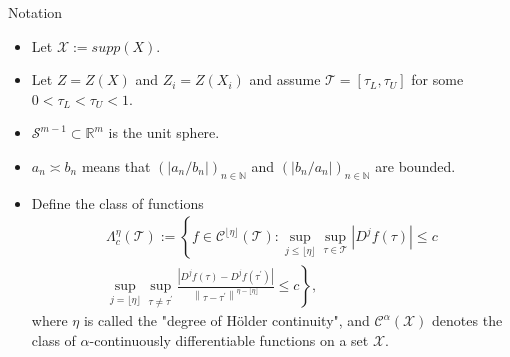 \documentclass[11pt]{beamer}
\begin{document}
\begin{frame}{Notation}
\begin{itemize}
\item Let $\mathcal{X}:=supp(X)$.
\item Let $Z=Z(X)$ and $Z_i=Z(X_i)$ and assume $\mathcal{T}=\left[\tau_{L}, \tau_{U}\right]$ for some $0<\tau_L<\tau_U<1$.
\item $\mathcal{S}^{m-1} \subset \mathbb{R}^{m}$ is the unit sphere.
\item $a_{n} \asymp b_{n}$ means that $\left(\left|a_{n} / b_{n}\right|\right)_{n \in \mathbb{N}}$ and $\left(\left|b_{n} / a_{n}\right|\right)_{n \in \mathbb{N}}$ are bounded.
\item Define the class of functions
$$
\begin{array}{c}
\Lambda_{c}^{\eta}(\mathcal{T}):=\left\{f \in \mathcal{C}^{\lfloor\eta\rfloor}(\mathcal{T}): \sup _{j \leq\lfloor\eta\rfloor } \sup_{\tau \in \mathcal{T}} \left|D^{j} f(\tau)\right| \leq c\right. \\
\left.\sup _{j=\lfloor\eta \rfloor}\sup_{ \tau \neq \tau^{\prime}} \frac{\left|D^{j} f(\tau)-D^{j} f\left(\tau^{\prime}\right)\right|}{\left\|\tau-\tau^{\prime}\right\|^{\eta-\lfloor\eta\rfloor}} \leq c\right\},
\end{array}
$$
where $\eta$ is called the "degree of H\"older continuity", and $\mathcal{C}^{\alpha}(\mathcal{X})$ denotes the
class of $\alpha$-continuously differentiable functions on a set $\mathcal{X}$.
\end{itemize}
\end{frame}
\end{document}
